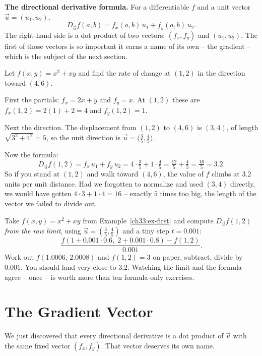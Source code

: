\begin{focusbox}
\textbf{The directional derivative formula.} For a differentiable $f$ and a unit
vector $\vec u=(u_1,u_2)$,
\[
  \boxed{\,D_{\vec u} f(a,b) = f_x(a,b)\,u_1 + f_y(a,b)\,u_2.\,}
\]
The right-hand side is a dot product of two vectors: $(f_x,f_y)$ and
$(u_1,u_2)$. The first of those vectors is so important it earns a name of its
own -- the gradient -- which is the subject of the next section.
\end{focusbox}

\begin{example}
\label{ch33:ex-first}
Let $f(x,y)=x^2 + xy$ and find the rate of change at $(1,2)$ in the direction
toward $(4,6)$.

First the partials: $f_x = 2x + y$ and $f_y = x$. At $(1,2)$ these are
$f_x(1,2)=2(1)+2=4$ and $f_y(1,2)=1$.

Next the direction. The displacement from $(1,2)$ to $(4,6)$ is $(3,4)$, of length
$\sqrt{3^2+4^2}=5$, so the unit direction is $\vec u=\big(\tfrac35,\tfrac45\big)$.

Now the formula:
\[
  D_{\vec u} f(1,2) = f_x\,u_1 + f_y\,u_2
  = 4\cdot\tfrac35 + 1\cdot\tfrac45 = \tfrac{12}{5}+\tfrac45 = \tfrac{16}{5}=3.2.
\]
So if you stand at $(1,2)$ and walk toward $(4,6)$, the value of $f$ climbs at
$3.2$ units per unit distance. Had we forgotten to normalize and used $(3,4)$
directly, we would have gotten $4\cdot 3 + 1\cdot 4 = 16$ -- exactly $5$ times too
big, the length of the vector we failed to divide out.
\end{example}

\begin{labbox}
Take $f(x,y)=x^2+xy$ from Example~\ref{ch33:ex-first} and compute
$D_{\vec u}f(1,2)$ \emph{from the raw limit}, using $\vec u=(\tfrac35,\tfrac45)$
and a tiny step $t=0.001$:
\[
  \frac{f(1+0.001\cdot 0.6,\; 2+0.001\cdot 0.8)-f(1,2)}{0.001}.
\]
Work out $f(1.0006,\,2.0008)$ and $f(1,2)=3$ on paper, subtract, divide by
$0.001$. You should land very close to $3.2$. Watching the limit and the formula
agree -- once -- is worth more than ten formula-only exercises.
\end{labbox}

\section{The Gradient Vector}
\label{ch33:gradient}

We just discovered that every directional derivative is a dot product of $\vec u$
with the same fixed vector $(f_x, f_y)$. That vector deserves its own name.

